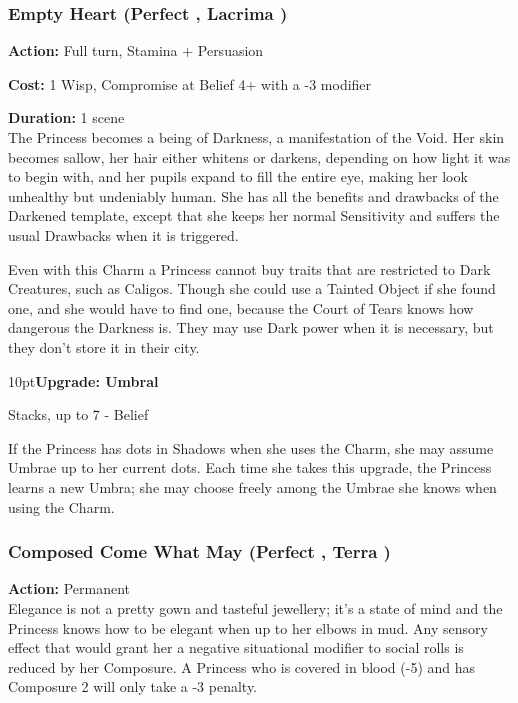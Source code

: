 \subsubsection*{Empty Heart (Perfect \textbullet\textbullet, Lacrima \textbullet\textbullet\textbullet\textbullet)}

\noindent \textbf{Action:} Full turn, Stamina + Persuasion

\noindent \textbf{Cost:} 1 Wisp, Compromise at Belief 4+ with a -3 modifier

\noindent \textbf{Duration:} 1 scene \\

\noindent The Princess becomes a being of Darkness, a manifestation of the Void. Her skin becomes sallow, her hair either whitens or darkens, depending on how light it was to begin with, and her pupils expand to fill the entire eye, making her look unhealthy but undeniably human. She has all the benefits and drawbacks of the Darkened template, except that she keeps her normal Sensitivity and suffers the usual Drawbacks when it is triggered.

Even with this Charm a Princess cannot buy traits that are restricted to Dark Creatures, such as Caligos. Though she could use a Tainted Object if she found one, and she would have to find one, because the Court of Tears knows how dangerous the Darkness is. They may use Dark power when it is necessary, but they don't store it in their city. 

\begin{myindentpar}{10pt}\textbf{Upgrade: Umbral}

Stacks, up to 7 - Belief

If the Princess has dots in Shadows when she uses the Charm, she may assume Umbrae up to her current dots. Each time she takes this upgrade, the Princess learns a new Umbra; she may choose freely among the Umbrae she knows when using the Charm. \end{myindentpar}

\subsubsection*{Composed Come What May (Perfect \textbullet\textbullet, Terra \textbullet\textbullet)}

\noindent \textbf{Action:} Permanent \\

\noindent Elegance is not a pretty gown and tasteful jewellery; it's a state of mind and the Princess knows how to be elegant when up to her elbows in mud. Any sensory effect that would grant her a negative situational modifier to social rolls is reduced by her Composure. A Princess who is covered in blood (-5) and has Composure 2 will only take a -3 penalty.

